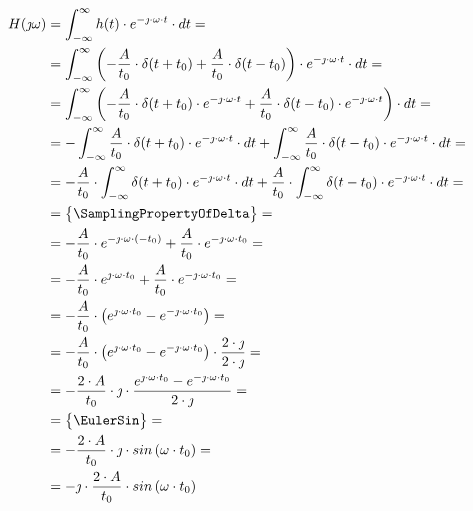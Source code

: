 \begin{task}
\begin{align*}
H(\jmath \omega )&=\int_{-\infty }^{\infty}h(t) \cdot e^{-\jmath \cdot \omega \cdot t}\cdot dt=\\
&=\int_{-\infty }^{\infty}\left( -\frac{A}{t_0} \cdot \delta(t+t_0) + \frac{A}{t_0} \cdot \delta(t-t_0) \right) \cdot e^{-\jmath \cdot \omega \cdot t}\cdot dt=\\
&=\int_{-\infty }^{\infty}\left( -\frac{A}{t_0} \cdot \delta(t+t_0)\cdot e^{-\jmath \cdot \omega \cdot t} + \frac{A}{t_0} \cdot \delta(t-t_0)\cdot e^{-\jmath \cdot \omega \cdot t} \right) \cdot dt=\\
&=-\int_{-\infty }^{\infty} \frac{A}{t_0} \cdot \delta(t+t_0)\cdot e^{-\jmath \cdot \omega \cdot t}\cdot dt + \int_{-\infty }^{\infty} \frac{A}{t_0} \cdot \delta(t-t_0)\cdot e^{-\jmath \cdot \omega \cdot t} \cdot dt=\\
&= -\frac{A}{t_0} \cdot \int_{-\infty }^{\infty} \delta(t+t_0)\cdot e^{-\jmath \cdot \omega \cdot t}\cdot dt + \frac{A}{t_0} \cdot \int_{-\infty }^{\infty}  \delta(t-t_0)\cdot e^{-\jmath \cdot \omega \cdot t} \cdot dt=\\
&=\begin{Bmatrix}
\SamplingPropertyOfDelta
\end{Bmatrix}=\\
&= -\frac{A}{t_0} \cdot e^{-\jmath \cdot \omega \cdot (-t_0)} + \frac{A}{t_0} \cdot e^{-\jmath \cdot \omega \cdot t_0}=\\
&= -\frac{A}{t_0} \cdot e^{\jmath \cdot \omega \cdot t_0} + \frac{A}{t_0} \cdot e^{-\jmath \cdot \omega \cdot t_0}=\\
&= -\frac{A}{t_0} \cdot \left(e^{\jmath \cdot \omega \cdot t_0} - e^{-\jmath \cdot \omega \cdot t_0}\right)=\\
&= -\frac{A}{t_0} \cdot \left(e^{\jmath \cdot \omega \cdot t_0} - e^{-\jmath \cdot \omega \cdot t_0}\right) \cdot \frac{2\cdot \jmath}{2\cdot \jmath}=\\
&= -\frac{2\cdot A}{t_0} \cdot \jmath \cdot \frac{e^{\jmath \cdot \omega \cdot t_0} - e^{-\jmath \cdot \omega \cdot t_0}}{2\cdot \jmath}=\\
&=\begin{Bmatrix}
\EulerSin
\end{Bmatrix}=\\
&= -\frac{2\cdot A}{t_0} \cdot \jmath \cdot sin\left( \omega \cdot t_0\right)=\\
&= -\jmath \cdot \frac{2\cdot A}{t_0} \cdot sin\left( \omega \cdot t_0\right)
\end{align*}


\end{task}
